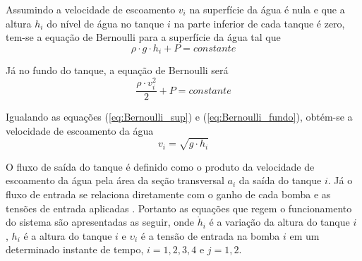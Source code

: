 \begin{example}
Assumindo a velocidade de escoamento $v_i$ na superfície da água é nula e que a altura $h_i$ do nível de água no tanque $i$ na parte inferior de cada tanque é zero, tem-se a equação de Bernoulli para a superfície da água tal que
\begin{equation}\label{eq:Bernoulli_sup}
 \rho  \cdot g  \cdot h_i + P = constante
\end{equation}

Já no fundo do tanque, a equação de Bernoulli será
\begin{equation}\label{eq:Bernoulli_fundo}
 \dfrac{\rho \cdot v_i^2}{2} + P = constante 
\end{equation}

Igualando as equações (\ref{eq:Bernoulli_sup}) e (\ref{eq:Bernoulli_fundo}), obtém-se a velocidade de escoamento da água
\begin{equation}\label{eq:vel_escoamento}
 v_i = \sqrt{g \cdot h_i} 
\end{equation}

O fluxo de saída do tanque é definido como o produto da velocidade de escoamento da água pela área da seção transversal $a_i$ da saída do tanque $i$. Já o fluxo de entrada se relaciona diretamente com o ganho de cada bomba e as tensões de entrada aplicadas \cite{inproc:arthur:2015}. Portanto as equações que regem o funcionamento do sistema são apresentadas as seguir, onde $\dot{h}_i$ é a variação da altura do tanque $i$ , $h_i$ é a altura do tanque $i$ e  $\upsilon_i$ é a tensão de entrada na bomba $i$ em um determinado instante de tempo, $ i = 1, 2, 3, 4$ e $j = 1, 2$.


\end{example}
